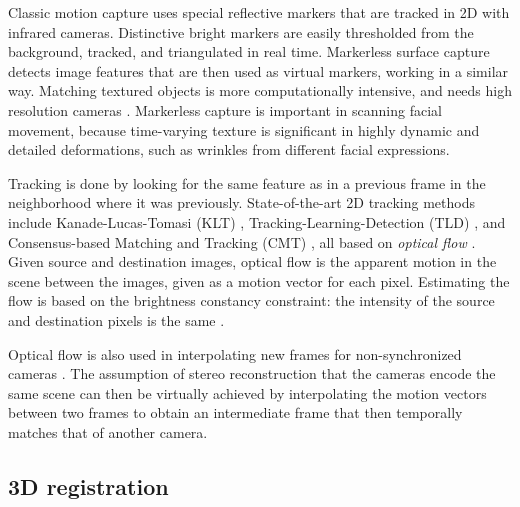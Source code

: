 
Classic motion capture uses special reflective markers that are tracked in 2D with infrared cameras.
Distinctive bright markers are easily thresholded from the background, tracked, and triangulated in real time.
Markerless surface capture detects image features that are then used as virtual markers, working in a similar way.
Matching textured objects is more computationally intensive, and needs high resolution cameras \cite{moeslund2001survey}.
Markerless capture is important in scanning facial movement, because time-varying texture is significant in highly dynamic and detailed deformations, such as wrinkles from different facial expressions.
\cite{bradley2008markerless,beeler2011high,bradley2010high}

Tracking is done by looking for the same feature as in a previous frame in the neighborhood where it was previously.
State-of-the-art 2D tracking methods include Kanade-Lucas-Tomasi (KLT) \cite{lucas1981iterative,tomasi1991detection}, Tracking-Learning-Detection (TLD) \cite{kalal2012tracking}, and Consensus-based Matching and Tracking (CMT) \cite{nebehay2014consensus}, all based on \emph{optical flow} \cite{horn1981determining,gibson1950perception,beauchemin1995computation}.
Given source and destination images, optical flow is the apparent motion in the scene between the images, given as a motion vector for each pixel.
Estimating the flow is based on the brightness constancy constraint: the intensity of the source and destination pixels is the same \cite{horn1974determining}.

Optical flow is also used in interpolating new frames for non-synchronized cameras \cite{bradley2009synchronization}.
The assumption of stereo reconstruction that the cameras encode the same scene can then be virtually achieved by interpolating the motion vectors between two frames to obtain an intermediate frame that then temporally matches that of another camera.


\subsection{3D registration} %

